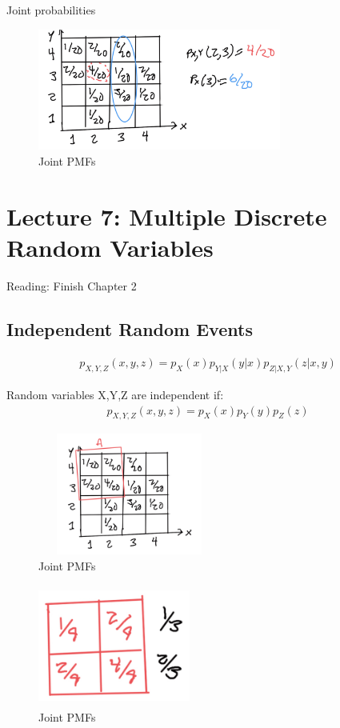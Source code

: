 \documentclass{article}
\begin{document}
 Joint probabilities

\begin{figure}[h]
\centering
\includegraphics[width=8cm, height=4cm]{images/L06/joint_pmf.jpeg}
\caption{Joint PMFs}
\end{figure}

\section{Lecture 7: Multiple Discrete Random Variables}

 Reading: Finish Chapter 2

\subsection{Independent Random Events}


\begin{align*}
p_{X,Y,Z}(x,y,z)=p_X(x)p_{Y|X}(y|x)p_{Z|X,Y}(z|x,y)
\end{align*}

Random variables X,Y,Z are independent if:
\begin{align*}
p_{X,Y,Z}(x,y,z)=p_X(x)p_{Y}(y)p_{Z}(z)
\end{align*}

\begin{figure}[h]
\centering
\includegraphics[width=6cm, height=4cm]{images/L07/IMG_1544.jpeg}
\caption{Joint PMFs}
\end{figure}

\begin{figure}[h]
\centering
\includegraphics[width=5cm, height=4cm]{images/L07/IMG_1545.jpeg}
\caption{Joint PMFs}
\end{figure}
\end{document}
